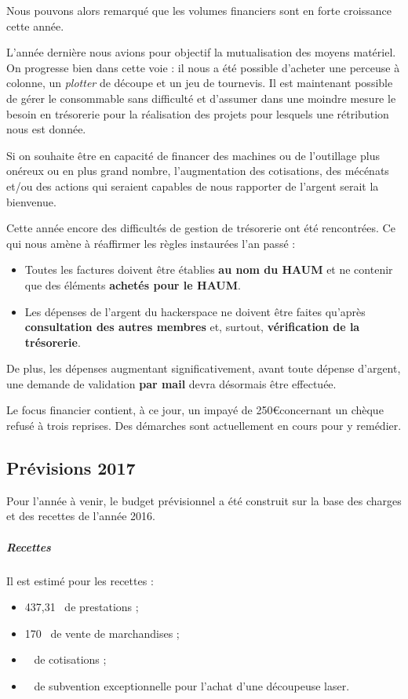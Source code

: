 \documentclass[11pt]{article}
\begin{document}
Nous pouvons alors remarqué que les volumes financiers sont en forte croissance
cette année.

L'année dernière nous avions pour objectif la mutualisation des moyens matériel.
On progresse bien dans cette voie : il nous a été possible d'acheter une perceuse à
colonne, un \textit{plotter} de découpe et un jeu de tournevis.
Il est maintenant possible de gérer le consommable sans difficulté et d'assumer dans
une moindre mesure le besoin en trésorerie pour la réalisation des projets pour lesquels
une rétribution nous est donnée.

Si on souhaite être en capacité de financer des machines ou de l'outillage plus onéreux
ou en plus grand nombre, l'augmentation des cotisations, des mécénats et/ou des
actions qui seraient capables de nous rapporter de l'argent serait la bienvenue.

\bigskip

Cette année encore des difficultés de gestion de trésorerie ont été rencontrées. Ce qui
nous amène à réaffirmer les règles instaurées l'an passé :
\begin{itemize}
 \item Toutes les factures doivent être établies \textbf{au nom du HAUM} et ne
 contenir que des éléments \textbf{achetés pour le HAUM}.
 \item Les dépenses de l'argent du hackerspace ne doivent être faites qu'après
 \textbf{consultation des autres membres} et, surtout, \textbf{vérification de la
 trésorerie}.
\end{itemize}
De plus, les dépenses augmentant significativement, avant toute dépense d'argent, une
demande de validation \textbf{par mail} devra désormais être effectuée.

Le focus financier contient, à ce jour, un impayé de 250\euro concernant un chèque refusé
à trois reprises. Des démarches sont actuellement en cours pour y remédier.

\subsection{Prévisions 2017}

Pour l'année à venir, le budget prévisionnel a été construit sur la base des charges
et des recettes de l'année 2016.

\subparagraph{Recettes}
Il est estimé pour les recettes :
\begin{itemize}
 \item 437,31~\officialeuro{} de prestations ;
 \item 170~\officialeuro{} de vente de marchandises ;
 \item {}~\officialeuro{} de cotisations ;
 \item {}~\officialeuro{} de subvention exceptionnelle pour l'achat d'une découpeuse laser.
\end{itemize}
\end{document}
